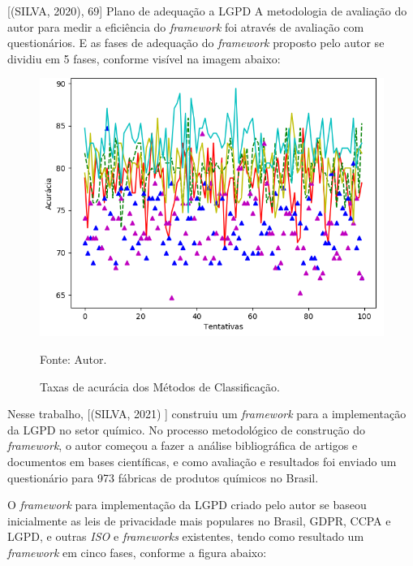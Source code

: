 \documentclass[
	12pt,				%
	openright,			%
	oneside,			%
	a4paper,			%
	english,			%
	french,				%
	spanish,			%
	brazil,				%
	]{abntex2}
\begin{document}
[(SILVA, 2020), 69] Plano de adequação a LGPD
A metodologia de avaliação do autor para medir a eficiência do \textit{framework}  foi através de avaliação com questionários. E as fases de adequação do \textit{framework}  proposto pelo autor se dividiu em 5 fases, conforme visível na imagem abaixo: 

\begin{figure}[ht]
    \centering
    \caption{Taxas de acurácia dos Métodos de Classificação.}
    \includegraphics[width=5.0in]{Images/acc-classification.png}
    \label{fig: grafico-acc}
    
    \centering \small Fonte: Autor.
\end{figure}

Nesse trabalho, [(SILVA, 2021) ] construiu um \textit{framework} para a implementação da LGPD no setor químico. No processo metodológico de construção do \textit{framework}, o autor começou a fazer a análise bibliográfica de artigos e documentos em bases científicas, e como avaliação e resultados foi enviado um questionário para 973 fábricas de produtos químicos no Brasil.

O \textit{framework} para implementação da LGPD criado pelo autor se baseou inicialmente as leis de privacidade mais populares no Brasil, GDPR, CCPA e LGPD, e outras \textit{ISO} e \textit{frameworks} existentes, tendo como resultado um \textit{framework} em cinco fases, conforme a figura abaixo:
\end{document}

